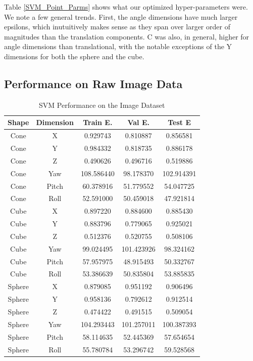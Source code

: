 \documentclass[journal]{IEEEtran}
\begin{document}
Table \ref{SVM_Point_Parms} shows what our optimized hyper-parameters were. We note a few general trends. First, the angle dimensions have much larger epsilons, which inutuitively makes sense as they span over larger order of magnitudes than the translation components. C was also, in general, higher for angle dimensions than translational, with the notable exceptions of the Y dimensions for both the sphere and the cube.

\subsection{Performance on Raw Image Data}

\begin{table}[h]
\caption{SVM Performance on the Image Dataset}
\label{SVM_Image}
\centering

\begin{tabular}{|c|c|c|c|c|}
\hline
Shape & Dimension & Train E. & Val E. & Test E\\
\hline
Cone & X & 0.929743 & 0.810887 & 0.856581\\
Cone & Y & 0.984332 & 0.818735 & 0.886178\\
Cone & Z & 0.490626 & 0.496716 & 0.519886\\
Cone & Yaw & 108.586440 & 98.178370 & 102.914391\\
Cone & Pitch & 60.378916 & 51.779552 & 54.047725\\
Cone & Roll & 52.591000 & 50.459018 & 47.921814\\
\hline
Cube & X & 0.897220 & 0.884600 & 0.885430\\
Cube & Y & 0.883796 & 0.779065 & 0.925021\\
Cube & Z & 0.512376 & 0.520755 & 0.508106\\
Cube & Yaw & 99.024495 & 101.423926 & 98.324162\\
Cube & Pitch & 57.957975 & 48.915493 & 50.332767\\
Cube & Roll & 53.386639 & 50.835804 & 53.885835\\
\hline
Sphere & X & 0.879085 & 0.951192 & 0.906496\\
Sphere & Y & 0.958136 & 0.792612 & 0.912514\\
Sphere & Z & 0.474422 & 0.491515 & 0.509054\\
Sphere & Yaw & 104.293443 & 101.257011 & 100.387393\\
Sphere & Pitch & 58.114635 & 52.445369 & 57.654654\\
Sphere & Roll & 55.780784 & 53.296742 & 59.528568\\
\hline
\end{tabular}

\end{table}
\end{document}
